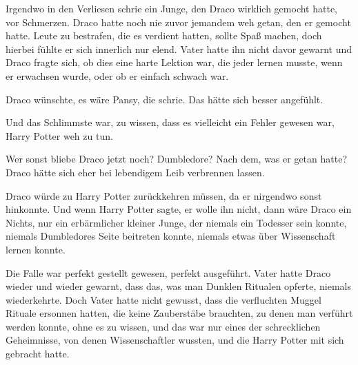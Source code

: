 Irgendwo in den Verliesen schrie ein Junge, den Draco wirklich gemocht hatte, vor Schmerzen. Draco hatte noch nie zuvor jemandem weh getan, den er gemocht hatte. Leute zu bestrafen, die es verdient hatten, sollte Spaß machen, doch hierbei fühlte er sich innerlich nur elend. Vater hatte ihn nicht davor gewarnt und Draco fragte sich, ob dies eine harte Lektion war, die jeder lernen musste, wenn er erwachsen wurde, oder ob er einfach schwach war.

Draco wünschte, es wäre Pansy, die schrie. Das hätte sich besser angefühlt.

Und das Schlimmste war, zu wissen, dass es vielleicht ein Fehler gewesen war, Harry Potter weh zu tun.

Wer sonst bliebe Draco jetzt noch? Dumbledore? Nach dem, was er getan hatte? Draco hätte sich eher bei lebendigem Leib verbrennen lassen.

Draco würde zu Harry Potter zurückkehren müssen, da er nirgendwo sonst hinkonnte. Und wenn Harry Potter sagte, er wolle ihn nicht, dann wäre Draco ein Nichts, nur ein erbärmlicher kleiner Junge, der niemals ein Todesser sein konnte, niemals Dumbledores Seite beitreten konnte, niemals etwas über Wissenschaft lernen konnte.

Die Falle war perfekt gestellt gewesen, perfekt ausgeführt. Vater hatte Draco wieder und wieder gewarnt, dass das, was man Dunklen Ritualen opferte, niemals wiederkehrte. Doch Vater hatte nicht gewusst, dass die verfluchten Muggel Rituale ersonnen hatten, die keine Zauberstäbe brauchten, zu denen man verführt werden konnte, ohne es zu wissen, und das war nur eines der schrecklichen Geheimnisse, von denen Wissenschaftler wussten, und die Harry Potter mit sich gebracht hatte.

